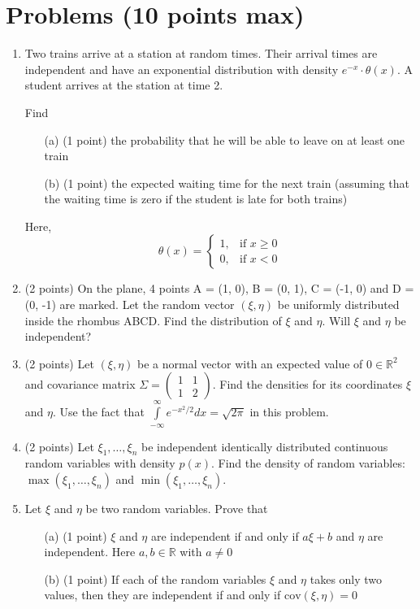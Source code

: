 \documentclass{article}
\begin{document}
\section*{Problems (10 points max)}

\begin{enumerate}
  \item Two trains arrive at a station at random times. Their arrival times are independent and have an exponential distribution with density $e^{-x} \cdot \theta(x)$. A student arrives at the station at time 2. 
  
  Find 
  \begin{itemize}
      \item[(a)] (1 point) the probability that he will be able to leave on at least one train
      \item[(b)] (1 point) the expected waiting time for the next train 
      (assuming that the waiting time is zero if the student is late 
      for both trains)
  \end{itemize}
  Here, 
  $$\theta(x) = \begin{cases} 1, & \text{if } x \geq 0 \\ 0, & \text{if } x < 0 \end{cases}$$

  \item (2 points) On the plane, 4 points A = (1, 0), B = (0, 1), C = (-1, 0) and D = (0, -1) are marked. 
  Let the random vector $(\xi, \eta)$ be uniformly distributed inside the rhombus ABCD. 
  Find the distribution of $\xi$ and $\eta$. 
  Will $\xi$ and $\eta$ be independent?

  \item (2 points) Let $(\xi, \eta)$ be a normal vector with an expected value of 
  $0 \in \mathbb{R}^2$ and covariance matrix $\Sigma = \begin{pmatrix} 1 & 1 \\ 1 & 2 \end{pmatrix}$. 
  Find the densities for its coordinates $\xi$ and $\eta$. 
  Use the fact that $\int\limits_{-\infty}^{\infty} e^{-x^2/2} dx = \sqrt{2\pi}$ in this problem.

  \item (2 points) Let $\xi_1, \ldots, \xi_n$ be independent identically distributed 
  continuous random variables with density $p(x)$. 
  Find the density of random variables: $\max(\xi_1, \ldots, \xi_n)$ and 
  $\min(\xi_1, \ldots, \xi_n)$.

  \item Let $\xi$ and $\eta$ be two random variables. Prove that
  \begin{itemize}
      \item[(a)] (1 point) $\xi$ and $\eta$ are independent if and only if $a\xi + b$ and $\eta$ are independent. Here $a, b \in \mathbb{R}$ with $a \neq 0$
      \item[(b)] (1 point) If each of the random variables $\xi$ and $\eta$ takes only two values, then they are independent if and only if $\text{cov}(\xi, \eta) = 0$
  \end{itemize}
\end{enumerate}
\end{document}
